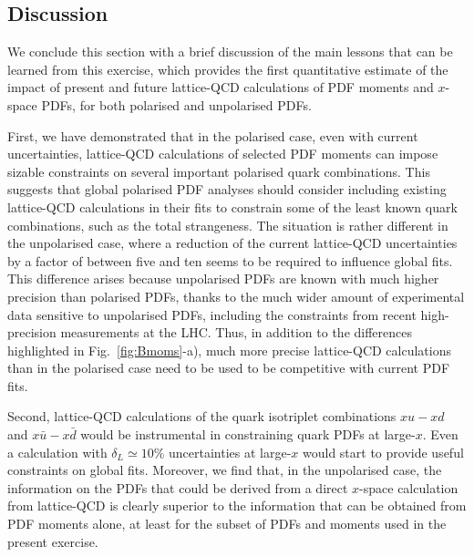 \subsection{Discussion}

We conclude this section with a brief discussion of the main lessons that
can be learned from this exercise, which provides the first quantitative estimate
of the impact of present and future lattice-QCD calculations of PDF moments
and $x$-space PDFs, for both polarised and unpolarised PDFs.

First, we have demonstrated that in the polarised case,
even with current uncertainties, lattice-QCD calculations of
selected PDF moments can impose sizable constraints on several
important polarised quark combinations.
%
This suggests that global polarised PDF analyses should consider
including existing lattice-QCD calculations in their fits to constrain some
of the least known quark combinations, such as the total strangeness.
%
The situation is rather different in the unpolarised case,
where a reduction of the current lattice-QCD uncertainties by a factor of between five 
and ten seems to be required to influence global fits.
%
This difference arises because unpolarised PDFs are known with much higher precision than polarised
PDFs, thanks to the much wider amount of experimental data sensitive to unpolarised PDFs,
including the constraints from recent high-precision measurements at the
LHC.
%
Thus, 
in addition to the differences highlighted  in Fig.~\ref{fig:Bmoms}-a),
much more precise lattice-QCD calculations than in the polarised case 
need to be used to be competitive with current PDF fits.


Second, lattice-QCD calculations of the quark isotriplet combinations
$xu-xd$ and $x\bar{u}-x\bar{d}$ would be instrumental in constraining
quark PDFs at large-$x$.
%
Even a calculation with $\delta_L\simeq 10\%$ uncertainties at large-$x$ would
start to provide useful constraints on global fits.
%
Moreover, we find that, in the unpolarised case, the information on the
PDFs that could be derived from a direct $x$-space calculation
from lattice-QCD is clearly superior to the information that can be obtained
from PDF moments alone, at least for the subset of PDFs and moments used in the present
exercise.


